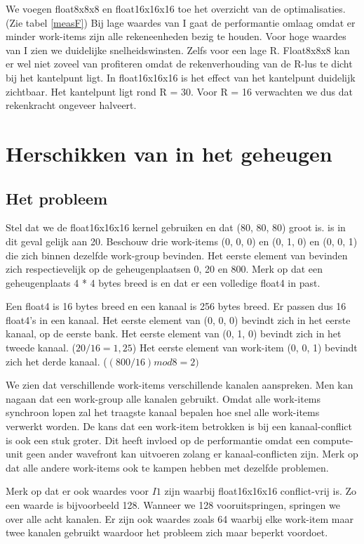 We voegen float8x8x8 en float16x16x16 toe het overzicht van de optimalisaties. (Zie tabel \ref{measF}) Bij lage waardes van I gaat de performantie omlaag omdat er minder work-items zijn alle rekeneenheden bezig te houden. Voor hoge waardes van I zien we duidelijke snelheidswinsten. Zelfs voor een lage R. Float8x8x8 kan er wel niet zoveel van profiteren omdat de rekenverhouding van de R-lus te dicht bij het kantelpunt ligt. In float16x16x16 is het effect van het kantelpunt duidelijk zichtbaar. Het kantelpunt ligt rond R = 30. Voor R = 16 verwachten we dus dat rekenkracht ongeveer halveert.


\section{Herschikken van \TT{} in het geheugen}
\subsection{Het probleem}
Stel dat we de float16x16x16 kernel gebruiken en dat \TT{} (80, 80, 80) groot is.  is in dit geval gelijk aan 20. Beschouw drie work-items (0, 0, 0) en (0, 1, 0) en (0, 0, 1) die zich binnen dezelfde work-group bevinden. Het eerste element van \TT{} bevinden zich respectievelijk op de geheugenplaatsen 0, 20 en 800. Merk op dat een geheugenplaats 4 * 4 bytes breed is en dat er een volledige float4 in past.

Een float4 is 16 bytes breed en een kanaal is 256 bytes breed. Er passen dus 16 float4's in een kanaal. Het eerste element van (0, 0, 0) bevindt zich in het eerste kanaal, op de eerste bank. Het eerste element van (0, 1, 0) bevindt zich in het tweede kanaal. ($20 / 16 = 1,25$) Het eerste element van work-item (0, 0, 1) bevindt zich het derde kanaal. ($(800 / 16) mod 8 = 2)$

We zien dat verschillende work-items verschillende kanalen aanspreken. Men kan nagaan dat een work-group alle kanalen gebruikt. Omdat alle work-items synchroon lopen zal het traagste kanaal bepalen hoe snel alle work-items verwerkt worden. De kans dat een work-item betrokken is bij een kanaal-conflict is ook een stuk groter. Dit heeft invloed op de performantie omdat een compute-unit geen ander wavefront kan uitvoeren zolang er kanaal-conflicten zijn. Merk op dat alle andere work-items ook te kampen hebben met dezelfde problemen.

Merk op dat er ook waardes voor $I1$ zijn waarbij float16x16x16 conflict-vrij is. Zo een waarde is bijvoorbeeld 128. Wanneer we 128 vooruitspringen, springen we over alle acht kanalen. Er zijn ook waardes zoals 64 waarbij elke work-item maar twee kanalen gebruikt waardoor het probleem zich maar beperkt voordoet.

